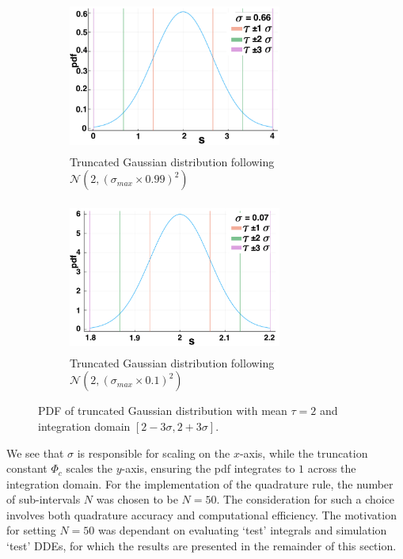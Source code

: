 \documentclass[12pt]{report}
\begin{document}
\begin{figure}[H]
    \centering
    \begin{subfigure}[b]{0.45\textwidth}
        \centering
        \includegraphics[width=7cm,height=5cm]{t2sig1.png}
        \caption{Truncated Gaussian distribution following $\mathcal{N}(2,(\sigma_{max}\times0.99)^2)$}
        \label{}
    \end{subfigure}
    \hfill
    \begin{subfigure}[b]{0.45\textwidth}
        \centering
        \includegraphics[width=7cm,height=5cm]{t2sig2.png}
        \caption{Truncated Gaussian distribution following $\mathcal{N}(2,(\sigma_{max}\times0.1)^2)$}
        \label{}
    \end{subfigure}
    \caption{PDF of truncated Gaussian distribution with mean $\tau=2$ and integration domain $[2-3\sigma,2+3\sigma]$.}
    \label{fig:pdf2}
\end{figure}
We see that $\sigma$ is responsible for scaling on the $x$-axis, while the truncation constant $\Phi_c$ scales the $y$-axis, ensuring the pdf integrates to $1$ across the integration domain. For the implementation of the quadrature rule, the number of sub-intervals $N$ was chosen to be $N=50$. The consideration for such a choice involves both quadrature accuracy and computational efficiency. The motivation for setting $N=50$ was dependant on evaluating `test' integrals and simulation `test' DDEs, for which the results are presented in the remainder of this section.
\end{document}
